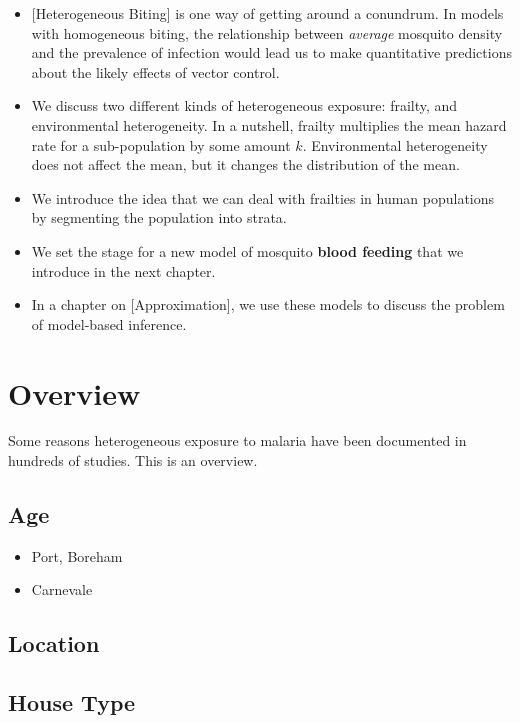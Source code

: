 \documentclass[
]{book}
\begin{document}
\begin{itemize}
\item
  {[}Heterogeneous Biting{]} is one way of getting around a conundrum. In models with homogeneous biting, the relationship between \emph{average} mosquito density and the prevalence of infection would lead us to make quantitative predictions about the likely effects of vector control.
\item
  We discuss two different kinds of heterogeneous exposure: frailty, and environmental heterogeneity. In a nutshell, frailty multiplies the mean hazard rate for a sub-population by some amount \(k\). Environmental heterogeneity does not affect the mean, but it changes the distribution of the mean.
\item
  We introduce the idea that we can deal with frailties in human populations by segmenting the population into strata.
\item
  We set the stage for a new model of mosquito \textbf{blood feeding} that we introduce in the next chapter.
\item
  In a chapter on {[}Approximation{]}, we use these models to discuss the problem of model-based inference.
\end{itemize}

\hypertarget{overview}{%
\section{Overview}\label{overview}}

Some reasons heterogeneous exposure to malaria have been documented in hundreds of studies. This is an overview.

\hypertarget{age-1}{%
\subsection{Age}\label{age-1}}

\begin{itemize}
\item
  Port, Boreham
\item
  Carnevale
\end{itemize}

\hypertarget{location}{%
\subsection{Location}\label{location}}

\hypertarget{house-type}{%
\subsection{House Type}\label{house-type}}
\end{document}
